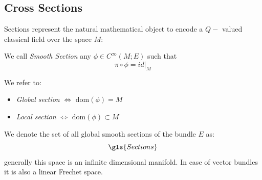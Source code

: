 \documentclass[Main]{subfiles}
\begin{document}
		\subsection{Cross Sections}
			Sections represent the natural mathematical object to encode a $Q-$ valued classical field over the space $M$:			
			\begin{definition}
				We call \emph{Smooth Section} 	any $\phi\in C^\infty(M;E)$ such that $$\pi\circ\phi = id|_M$$		
			\end{definition}
				We refer to:
					\begin{itemize}
						\item \emph{Global section} $\Leftrightarrow$ $\textrm{dom}(\phi) = M$
						\item \emph{Local section} $\Leftrightarrow$ $\textrm{dom}(\phi) \subset M$
					\end{itemize}
				We denote the set of all global smooth sections of the bundle $E$  as:
				\begin{displaymath}
					\gls{Sections}
				\end{displaymath}
			generally this space is an infinite dimensional manifold.
			In case of vector bundles it is also a linear Frechet space\cite{Kriegl}.
			
			
\end{document}
